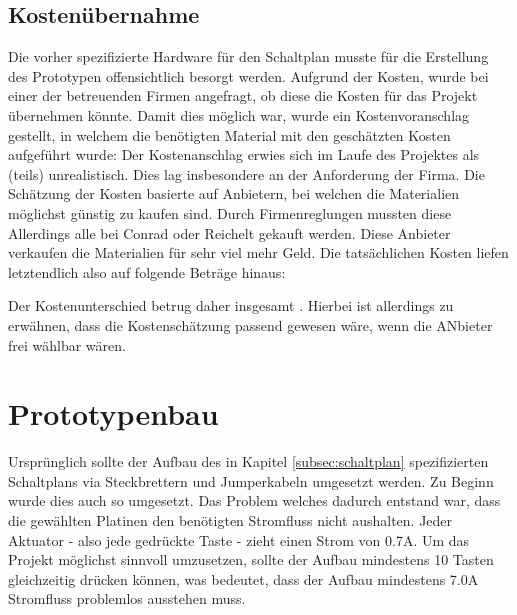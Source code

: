\subsection{Kostenübernahme}
Die vorher spezifizierte Hardware für den Schaltplan musste für die Erstellung des Prototypen offensichtlich besorgt werden.
Aufgrund der Kosten, wurde bei einer der betreuenden Firmen angefragt, ob diese die Kosten für das Projekt übernehmen
könnte.
Damit dies möglich war, wurde ein Kostenvoranschlag gestellt, in welchem die benötigten Material mit den geschätzten
Kosten aufgeführt wurde: \newline
Der Kostenanschlag erwies sich im Laufe des Projektes als (teils) unrealistisch. Dies lag insbesondere an der Anforderung
der Firma. Die Schätzung der Kosten basierte auf Anbietern, bei welchen die Materialien möglichst günstig zu kaufen sind.
Durch Firmenreglungen mussten diese Allerdings alle bei Conrad oder Reichelt
gekauft werden. Diese Anbieter verkaufen die Materialien für sehr viel mehr Geld. Die tatsächlichen Kosten liefen
letztendlich also auf folgende Beträge hinaus: \newline

Der Kostenunterschied betrug daher insgesamt .
Hierbei ist allerdings zu erwähnen, dass die Kostenschätzung passend gewesen wäre, wenn die ANbieter frei wählbar wären.

\section{Prototypenbau}
Ursprünglich sollte der Aufbau des in Kapitel \ref{subsec:schaltplan} spezifizierten Schaltplans via Steckbrettern und
Jumperkabeln umgesetzt werden.
Zu Beginn wurde dies auch so umgesetzt. Das Problem welches dadurch entstand war, dass die gewählten Platinen den
benötigten Stromfluss nicht aushalten.\newline
Jeder Aktuator - also jede gedrückte Taste - zieht einen Strom von 0.7A. Um das Projekt möglichst sinnvoll umzusetzen,
sollte der Aufbau mindestens 10 Tasten gleichzeitig drücken können, was bedeutet, dass der Aufbau mindestens 7.0A
Stromfluss problemlos ausstehen muss.


